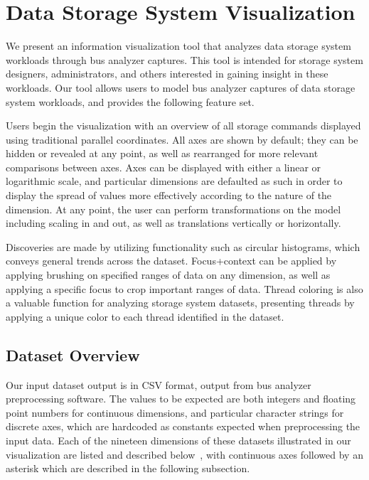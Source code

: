 \documentclass[journal]{vgtc}                %
\begin{document}
\section{Data Storage System Visualization}
\label{data-storage-system-visualization}

We present an information visualization tool that analyzes data storage system workloads through bus analyzer captures. This tool is intended for storage system designers, administrators, and others interested in gaining insight in these workloads. Our tool allows users to model bus analyzer captures of data storage system workloads, and provides the following feature set.

Users begin the visualization with an overview of all storage commands displayed using traditional parallel coordinates. All axes are shown by default; they can be hidden or revealed at any point, as well as rearranged for more relevant comparisons between axes. Axes can be displayed with either a linear or logarithmic scale, and particular dimensions are defaulted as such in order to display the spread of values more effectively according to the nature of the dimension. At any point, the user can perform transformations on the model including scaling in and out, as well as translations vertically or horizontally.

Discoveries are made by utilizing functionality such as circular histograms, which conveys general trends across the dataset. Focus+context can be applied by applying brushing on specified ranges of data on any dimension, as well as applying a specific focus to crop important ranges of data. Thread coloring is also a valuable function for analyzing storage system datasets, presenting threads by applying a unique color to each thread identified in the dataset.

\subsection{Dataset Overview}
\label{dataset_overview}
Our input dataset output is in CSV format, output from bus analyzer preprocessing software. The values to be expected are both integers and floating point numbers for continuous dimensions, and particular character strings for discrete axes, which are hardcoded as constants expected when preprocessing the input data. Each of the nineteen dimensions of these datasets illustrated in our visualization are listed and described below~\cite{internal:requirements}, with continuous axes followed by an asterisk which are described in the following subsection.
\end{document}
